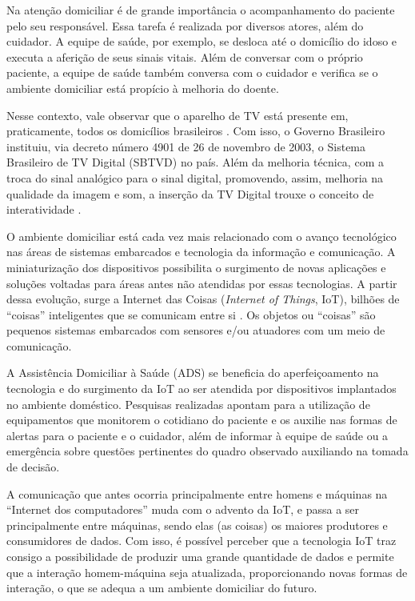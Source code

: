 Na atenção domiciliar é de grande importância o acompanhamento do paciente pelo
seu responsável.  Essa tarefa é realizada por diversos atores, além do
cuidador. A equipe de saúde, por exemplo, se desloca até o domicílio do idoso e
executa a aferição de seus sinais vitais. Além de conversar com o próprio
paciente, a equipe de saúde também conversa com o cuidador e verifica se o
ambiente domiciliar está propício à melhoria do doente.

Nesse contexto, vale observar que o aparelho de TV está presente em,
praticamente, todos os  domicílios brasileiros \cite{ibge2015tv}.  Com isso, o
Governo Brasileiro instituiu, via decreto número 4901 de 26 de novembro de
2003, o Sistema Brasileiro de TV Digital (SBTVD) no país.  Além da
melhoria técnica, com a troca do sinal analógico para o sinal  digital,
promovendo, assim, melhoria na qualidade da imagem e som, a inserção  da TV
Digital trouxe o conceito de interatividade \cite{digitaltv2015decree}.

O ambiente domiciliar está cada vez mais relacionado com o avanço tecnológico
nas áreas de sistemas embarcados e tecnologia da informação e comunicação. A
miniaturização dos dispositivos possibilita o surgimento de novas aplicações e
soluções voltadas para áreas antes não atendidas por essas tecnologias.  A
partir dessa evolução, surge a Internet das Coisas (\textit{Internet of
Things}, IoT), bilhões de ``coisas'' inteligentes que se comunicam entre si
\cite{li2015internet}. Os objetos ou ``coisas'' são pequenos sistemas
embarcados com sensores e/ou atuadores com um meio de comunicação. 

A Assistência Domiciliar à Saúde (ADS) se beneficia do aperfeiçoamento na
tecnologia e do surgimento da IoT ao ser atendida por dispositivos implantados
no ambiente doméstico.  Pesquisas realizadas \cite{triantafyllidis2013,moreira2016} 
apontam para a utilização de equipamentos que monitorem o cotidiano do paciente
e os auxilie nas formas de alertas para o paciente e o cuidador, além de
informar à equipe de saúde ou a emergência sobre questões pertinentes do quadro 
observado auxiliando na tomada de decisão.

A comunicação que antes ocorria principalmente entre homens e máquinas na ``Internet
dos computadores'' muda com o advento da IoT, e passa a ser principalmente entre
máquinas, sendo elas (as coisas) os maiores produtores e consumidores de dados.
Com isso, é possível perceber que a tecnologia IoT traz consigo a possibilidade de
produzir uma grande quantidade de dados e permite que a interação homem-máquina
seja atualizada, proporcionando novas formas de interação, o que se adequa a 
um ambiente domiciliar do futuro.

